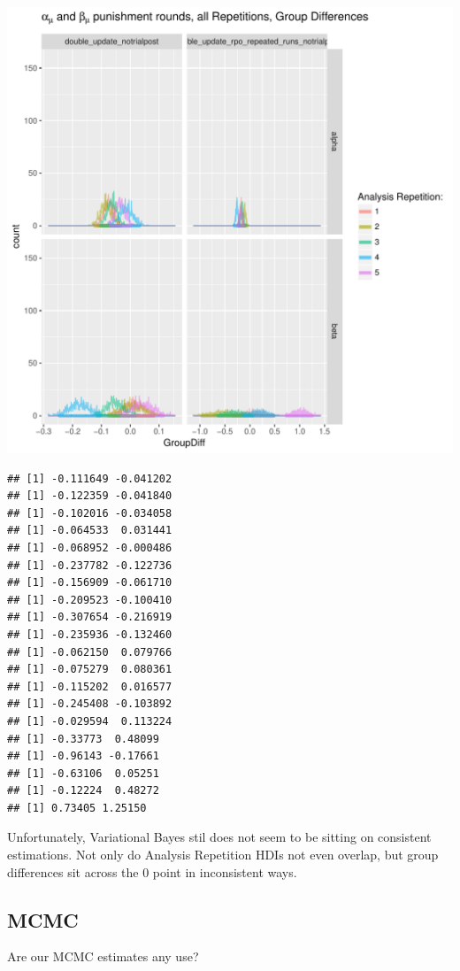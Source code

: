 \documentclass{article}\usepackage[]{graphicx}\usepackage[]{color}
\makeatletter
\def\maxwidth{ %
  \ifdim\Gin@nat@width>\linewidth
    \linewidth
  \else
    \Gin@nat@width
  \fi
}
\newenvironment{kframe}{%
 \def\at@end@of@kframe{}%
 \ifinner\ifhmode%
  \def\at@end@of@kframe{\end{minipage}}%
  \begin{minipage}{\columnwidth}%
 \fi\fi%
 \def\FrameCommand##1{\hskip\@totalleftmargin \hskip-\fboxsep
 \colorbox{shadecolor}{##1}\hskip-\fboxsep
     \hskip-\linewidth \hskip-\@totalleftmargin \hskip\columnwidth}%
 \MakeFramed {\advance\hsize-\width
   \@totalleftmargin\z@ \linewidth\hsize
   \@setminipage}}%
 {\par\unskip\endMakeFramed%
 \at@end@of@kframe}
\newenvironment{knitrout}{}{} %
\makeatother
\begin{document}
\begin{knitrout}
\includegraphics[width=\maxwidth]{figure/unnamed-chunk-6-3} 
\begin{kframe}\begin{verbatim}
## [1] -0.111649 -0.041202
## [1] -0.122359 -0.041840
## [1] -0.102016 -0.034058
## [1] -0.064533  0.031441
## [1] -0.068952 -0.000486
## [1] -0.237782 -0.122736
## [1] -0.156909 -0.061710
## [1] -0.209523 -0.100410
## [1] -0.307654 -0.216919
## [1] -0.235936 -0.132460
## [1] -0.062150  0.079766
## [1] -0.075279  0.080361
## [1] -0.115202  0.016577
## [1] -0.245408 -0.103892
## [1] -0.029594  0.113224
## [1] -0.33773  0.48099
## [1] -0.96143 -0.17661
## [1] -0.63106  0.05251
## [1] -0.12224  0.48272
## [1] 0.73405 1.25150
\end{verbatim}
\end{kframe}
\end{knitrout}

Unfortunately, Variational Bayes stil does not seem to be sitting on consistent estimations. Not only do Analysis Repetition HDIs not even overlap, but group differences sit across the 0 point in inconsistent ways.

\subsection*{MCMC}

Are our MCMC estimates any use?
\end{document}
